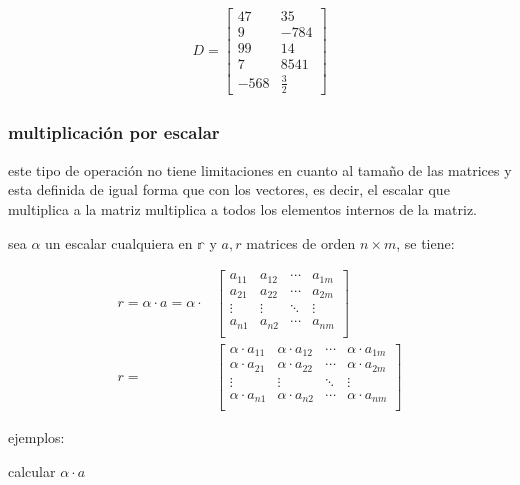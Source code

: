 \begin{align*}
    D =
    \begin{bmatrix}
        47 &  35\\
        9  & -784 \\
        99 & 14\\
        7 & 8541 \\
        -568 & \frac{3}{2}
    \end{bmatrix}
\end{align*}


\subsubsection{multiplicación por escalar} \label{multiplicacion_escalar}

este tipo de operación no tiene limitaciones en cuanto al tamaño de las matrices
y esta definida de igual forma que con los vectores, es decir, el escalar que
multiplica a la matriz multiplica a todos los elementos internos de la matriz.

sea $\alpha$ un escalar cualquiera en $\mathbb{r}$ y $a,r$ matrices de orden
$n\times m$, se tiene:

\begin{align*}
    r=\alpha\cdot a = \alpha\cdot
    &\begin{bmatrix}
        a_{11} & a_{12} & \cdots & a_{1m}\\
        a_{21} & a_{22} & \cdots & a_{2m}\\
        \vdots & \vdots & \ddots & \vdots\\
        a_{n1} & a_{n2} & \cdots & a_{nm}\\
    \end{bmatrix}\\
    r = &\begin{bmatrix}
        \alpha\cdot a_{11} & \alpha\cdot a_{12} & \cdots &\alpha\cdot a_{1m}\\
        \alpha\cdot a_{21} & \alpha\cdot  a_{22} & \cdots & \alpha\cdot  a_{2m}\\
        \vdots & \vdots & \ddots & \vdots\\
        \alpha\cdot  a_{n1} & \alpha\cdot  a_{n2} & \cdots & \alpha\cdot  a_{nm}\\
    \end{bmatrix}
\end{align*}

ejemplos:

calcular $ \alpha\cdot a $

